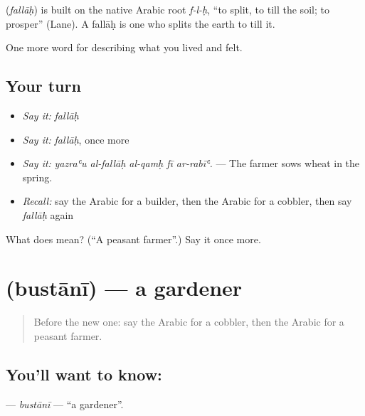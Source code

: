 \begin{cousinweb}
\textbf{} (\emph{fallāḥ}) is built on the native Arabic root \emph{f-l-ḥ}, \textquotedblleft{}to split, to till the soil; to prosper\textquotedblright{} (Lane). A fallāḥ is one who splits the earth to till it.
\end{cousinweb}

\begin{grammarlens}[title={What you've built}]
One more word for describing what you lived and felt.
\end{grammarlens}

\subsection*{Your turn}
\begin{itemize}
\raggedright
  \item \emph{Say it:} \emph{fallāḥ}
  \item \emph{Say it:} \emph{fallāḥ}, once more
  \item \emph{Say it:} \emph{yazraʿu al-fallāḥ al-qamḥ fī ar-rabīʿ.} — The farmer sows wheat in the spring.
  \item \emph{Recall:} say the Arabic for a builder, then the Arabic for a cobbler, then say \emph{fallāḥ} again
\end{itemize}

\begin{tcolorbox}[breakable,colback=teal!4,colframe=teal!35!black,title={Before you move on}]
What does  mean? (\textquotedblleft{}A peasant farmer\textquotedblright{}.) Say it once more.
\end{tcolorbox}
\section[\texorpdfstring{\ar{بستاني} (bustānī)}{بستاني (bustānī)}]{ (bustānī) — a gardener}

\label{lesson:AR-C527-bustani}



\begin{quote}
Before the new one: say the Arabic for a cobbler, then the Arabic for a peasant farmer.
\end{quote}

\subsection*{You'll want to know: }
\textbf{} — \emph{bustānī} — \textquotedblleft{}a gardener\textquotedblright{}.

